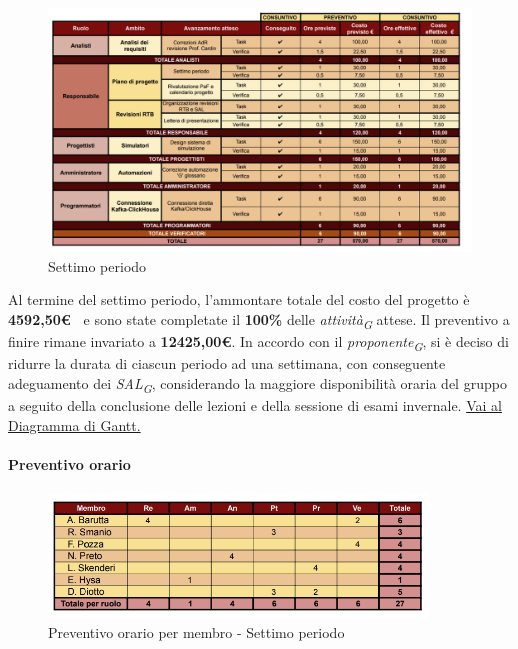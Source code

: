 \begin{figure}[H]
    \centering
    \includegraphics[height=0.9\textwidth]{../Images/tabG7.PNG}
    \caption{Settimo periodo}
    \label{fig:Settimo_periodo}
\end{figure}


Al termine del settimo periodo, l'ammontare totale del costo del progetto è \textbf{ 4592,50\euro\ } e sono state completate il \textbf{100\%} delle \textit{attività}\textsubscript{\textit{G}} attese.
Il preventivo a finire rimane invariato a \textbf{12425,00€}.
In accordo con il \textit{proponente}\textsubscript{\textit{G}}, si è deciso di ridurre la durata di ciascun periodo ad una settimana, con conseguente adeguamento dei \textit{SAL}\textsubscript{\textit{G}}, considerando la maggiore disponibilità oraria del gruppo a seguito della conclusione delle lezioni e della sessione di esami invernale.
\href{https://github.com/orgs/ByteOps-swe/projects/3/views/1?sortedBy%5Bdirection%5D=asc&sortedBy%5BcolumnId%5D=64182560}{Vai al Diagramma di Gantt.}

\pagebreak

\paragraph{Preventivo orario}

\begin{figure}[H] 
    \centering
    \includegraphics[width=0.9\textwidth]{../Images/tabPrev7.png}
    \caption{Preventivo orario per membro - Settimo periodo}
    \label{fig:Preventivo_orario_7}
\end{figure}

